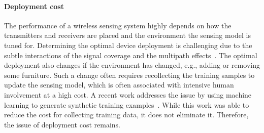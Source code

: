 \paragraph*{Deployment cost} The performance of a wireless sensing system highly depends on how the transmitters and receivers are placed
and the environment the sensing model is tuned for. Determining the optimal device deployment is challenging due to the subtle interactions
of the signal coverage and the multipath effects~\cite{wang2016human}. The optimal deployment also changes if the environment has changed,
e.g., adding or removing some furniture. Such a change often requires recollecting the training samples to update the sensing model, which
is often associated with intensive human involvement at a high cost. A recent work addresses the issue by using machine learning to
generate synthetic training examples~\cite{CrossSense}. While this work was able to reduce the cost for collecting training data, it does
not eliminate it. Therefore, the issue of deployment cost remains.




